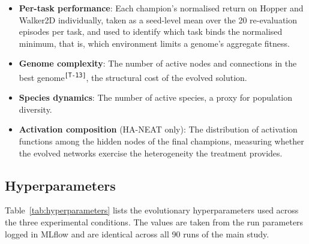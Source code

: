 \documentclass[12pt]{article}
\newcommand{\revID}[1]{\textsuperscript{\scriptsize\texttt{[#1]}}}
\newcommand{\revTerm}[2]{\textcolor{lrTeal}{#2}\revID{#1}}      %
\begin{document}
\begin{itemize}
    \item \textbf{Per-task performance}: Each champion's normalised return on Hopper and Walker2D individually, taken as a seed-level mean over the 20 re-evaluation episodes per task, and used to identify which task binds the normalised minimum, that is, which environment limits a genome's aggregate fitness.
    \item \textbf{Genome complexity}: \revTerm{T-13}{The number of active nodes and connections in the best genome}, the structural cost of the evolved solution.
    \item \textbf{Species dynamics}: The number of active species, a proxy for population diversity.
    \item \textbf{Activation composition} (HA-NEAT only): The distribution of activation functions among the hidden nodes of the final champions, measuring whether the evolved networks exercise the heterogeneity the treatment provides.
\end{itemize}

\subsection{Hyperparameters}
\label{subsec:hyperparameters}

Table~\ref{tab:hyperparameters} lists the evolutionary hyperparameters used across the three experimental conditions.
The values are taken from the run parameters logged in MLflow and are identical across all 90 runs of the main study.
\end{document}
